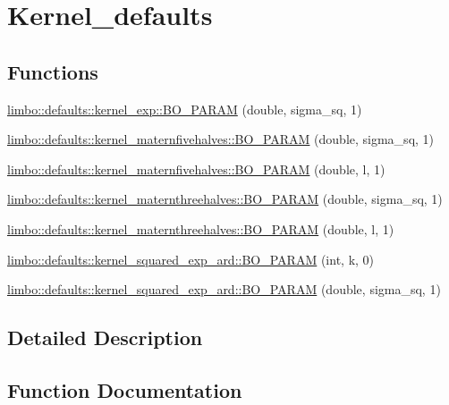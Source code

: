\hypertarget{group__kernel__defaults}{}\section{Kernel\+\_\+defaults}
\label{group__kernel__defaults}
\subsection*{Functions}
\begin{DoxyCompactItemize}
\item 
\hyperlink{group__kernel__defaults_ga202b52540fa68b47005cd9e3ef61a3fe}{limbo\+::defaults\+::kernel\+\_\+exp\+::\+B\+O\+\_\+\+P\+A\+R\+A\+M} (double, sigma\+\_\+sq, 1)
\item 
\hyperlink{group__kernel__defaults_ga001b0195485017f316c32002aba15139}{limbo\+::defaults\+::kernel\+\_\+maternfivehalves\+::\+B\+O\+\_\+\+P\+A\+R\+A\+M} (double, sigma\+\_\+sq, 1)
\item 
\hyperlink{group__kernel__defaults_gabc34e7cdebd3b2db4ffa355ac8eb51e9}{limbo\+::defaults\+::kernel\+\_\+maternfivehalves\+::\+B\+O\+\_\+\+P\+A\+R\+A\+M} (double, l, 1)
\item 
\hyperlink{group__kernel__defaults_ga76321c51e14ac1db904dd1411771e391}{limbo\+::defaults\+::kernel\+\_\+maternthreehalves\+::\+B\+O\+\_\+\+P\+A\+R\+A\+M} (double, sigma\+\_\+sq, 1)
\item 
\hyperlink{group__kernel__defaults_ga5e0b13e8fe6cc8b335d86ed94631225d}{limbo\+::defaults\+::kernel\+\_\+maternthreehalves\+::\+B\+O\+\_\+\+P\+A\+R\+A\+M} (double, l, 1)
\item 
\hyperlink{group__kernel__defaults_ga913157eccae4e432cb2fd43ec682773c}{limbo\+::defaults\+::kernel\+\_\+squared\+\_\+exp\+\_\+ard\+::\+B\+O\+\_\+\+P\+A\+R\+A\+M} (int, k, 0)
\item 
\hyperlink{group__kernel__defaults_ga5322933a812efe2019e375cd2b4875fc}{limbo\+::defaults\+::kernel\+\_\+squared\+\_\+exp\+\_\+ard\+::\+B\+O\+\_\+\+P\+A\+R\+A\+M} (double, sigma\+\_\+sq, 1)
\end{DoxyCompactItemize}


\subsection{Detailed Description}


\subsection{Function Documentation}
\hypertarget{group__kernel__defaults_ga913157eccae4e432cb2fd43ec682773c}{}
